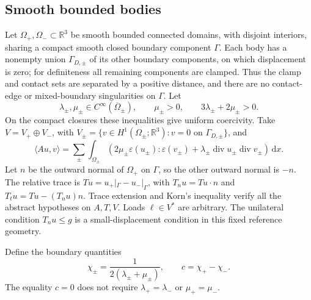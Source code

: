 \documentclass[11pt,a4paper]{article}
\theoremstyle{definition}\newtheorem{definition}[theorem]{Definition}
\theoremstyle{remark}\newtheorem{remark}[theorem]{Remark}
\newcommand{\R}{\mathbb R}
\newcommand{\dd}{\,\mathrm d}
\newcommand{\ip}[2]{\langle #1,#2\rangle}
\numberwithin{equation}{section}
\begin{document}
\subsection{Smooth bounded bodies}
Let $\Omega_+,\Omega_-\subset\R^3$ be smooth bounded connected domains, with disjoint interiors, sharing a compact smooth closed boundary component $\Gamma$. Each body has a nonempty union $\Gamma_{D,\pm}$ of its other boundary components, on which displacement is zero; for definiteness all remaining components are clamped. Thus the clamp and contact sets are separated by a positive distance, and there are no contact-edge or mixed-boundary singularities on $\Gamma$. Let
\[
 \lambda_\pm,\mu_\pm\in C^\infty(\overline\Omega_\pm),\qquad
 \mu_\pm>0,\qquad 3\lambda_\pm+2\mu_\pm>0.
\]
On the compact closures these inequalities give uniform coercivity. Take $V=V_+\oplus V_-$, with $V_\pm=\{v\in H^1(\Omega_\pm;\R^3):v=0\text{ on }\Gamma_{D,\pm}\}$, and
\begin{equation}\label{eq:elasticpair}
 \ip{Au}{v}=\sum_{\pm}\int_{\Omega_\pm}
  \left(2\mu_\pm\varepsilon(u_\pm):\varepsilon(v_\pm)
             +\lambda_\pm\operatorname{div}u_\pm\operatorname{div}v_\pm\right)\dd x.
\end{equation}
Let $n$ be the outward normal of $\Omega_+$ on $\Gamma$, so the other outward normal is $-n$. The relative trace is $T u=u_+|_\Gamma-u_-|_\Gamma$, with $T_nu=Tu\cdot n$ and $T_tu=Tu-(T_nu)n$. Trace extension and Korn's inequality verify all the abstract hypotheses on $A,T,V$. Loads $\ell\in V^*$ are arbitrary. The unilateral condition $T_nu\le g$ is a small-displacement condition in this fixed reference geometry.

Define the boundary quantities
\begin{equation}\label{eq:chi}
 \chi_\pm=\frac1{2(\lambda_\pm+\mu_\pm)},\qquad
 c=\chi_+-\chi_-.
\end{equation}
The equality $c=0$ does not require $\lambda_+=\lambda_-$ or $\mu_+=\mu_-$.
\end{document}
